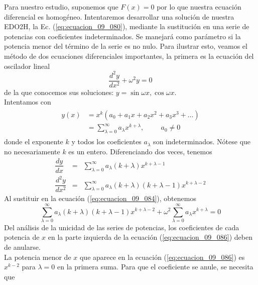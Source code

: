 Para nuestro estudio, suponemos que $F(x)=0$ por lo que nuestra ecuación diferencial es homogéneo. Intentaremos desarrollar una solución de nuestra EDO2H, la Ec. (\ref{eq:ecuacion_09_080}), mediante la sustitución en una serie de potencias con coeficientes indeterminados. Se manejará como parámetro si la potencia menor del término de la serie es no nulo. Para ilustrar esto, veamos el método de dos ecuaciones diferenciales importantes, la primera es la ecuación del oscilador lineal
\begin{equation}
\dfrac{d^{2} y}{d x^{2}} + \omega^{2} y = 0
\label{eq:ecuacion_09_084}
\end{equation}
de la que conocemos sus soluciones: $y= \sin \omega x, \cos \omega x$.
\\
Intentamos con
\begin{eqnarray*}
\begin{aligned}
y(x) &= x^{k} (a_{0} + a_{1} x + a_{2} x^{2} + a_{3} x^{3} + \ldots ) \\
&= \sum_{\lambda = 0}^{\infty} a_{\lambda} x^{k+\lambda}, \hspace{1cm} a_{0} \neq 0
\end{aligned}
\label{eq:ecuacion_09_085}
\end{eqnarray*}
donde el exponente $k$ y todos los coeficientes $a_{\lambda}$ son indeterminados. Nótese que no necesariamente $k$ es un entero. Diferenciando dos veces, tenemos
\begin{eqnarray*}
\dfrac{dy}{dx} &=& \sum_{\lambda=0}^{\infty} a_{\lambda} (k + \lambda) x^{k+\lambda-1} \nonumber \\
\dfrac{d^{2} y}{d x^{2}} &=& \sum_{\lambda=0}^{\infty} a_{\lambda} (k + \lambda) (k + \lambda - 1) x^{k + \lambda - 2} \nonumber
\end{eqnarray*}
Al sustituir en la ecuación (\ref{eq:ecuacion_09_084}), obtenemos
\begin{equation}
\sum_{\lambda=0}^{\infty} a_{\lambda} (k + \lambda) (k + \lambda - 1) x^{k + \lambda - 2} + \omega^{2} \sum_{\lambda = 0}^{\infty} a_{\lambda} x^{k+\lambda} = 0
\label{eq:ecuacion_09_086}
\end{equation}
Del análisis de la unicidad de las series de potencias, los coeficientes de cada potencia de $x$ en la parte izquierda de la ecuación (\ref{eq:ecuacion_09_086}) deben de anularse.
\\
La potencia menor de $x$ que aparece en la ecuación (\ref{eq:ecuacion_09_086}) es $x^{k-2}$ para $\lambda = 0$ en la primera suma. Para que el coeficiente se anule, se necesita que
